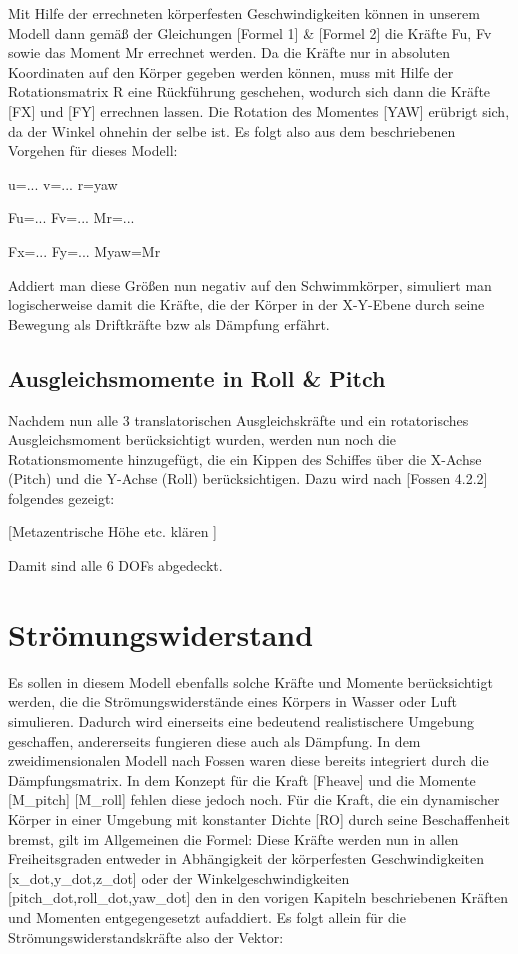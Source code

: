 Mit Hilfe der errechneten körperfesten Geschwindigkeiten können in unserem Modell dann gemäß der Gleichungen [Formel 1] & [Formel 2] die Kräfte Fu, Fv sowie das Moment Mr errechnet werden. 
Da die Kräfte nur in absoluten Koordinaten auf den Körper gegeben werden können, muss mit Hilfe der Rotationsmatrix R eine Rückführung geschehen, wodurch sich dann die Kräfte [FX] und [FY] errechnen lassen. Die Rotation des Momentes [YAW] erübrigt sich, da der Winkel ohnehin der selbe ist. 
Es folgt also aus dem beschriebenen Vorgehen für dieses Modell:

u=...
v=...
r=yaw

Fu=...
Fv=...
Mr=...

Fx=...
Fy=...
Myaw=Mr

Addiert man diese Größen nun negativ auf den Schwimmkörper, simuliert man logischerweise damit die Kräfte, die der Körper in der X-Y-Ebene durch seine Bewegung als Driftkräfte bzw als Dämpfung erfährt. 

%
\subsection{Ausgleichsmomente in Roll & Pitch}
%
Nachdem nun alle 3 translatorischen Ausgleichskräfte und ein rotatorisches Ausgleichsmoment berücksichtigt wurden, werden nun noch die Rotationsmomente hinzugefügt, die ein Kippen des Schiffes über die X-Achse (Pitch) und die Y-Achse (Roll) berücksichtigen. 
Dazu wird nach [Fossen 4.2.2] folgendes gezeigt:

[Metazentrische Höhe etc. klären ]


Damit sind alle 6 DOFs abgedeckt. 
%
\section{Strömungswiderstand}
%
Es sollen in diesem Modell ebenfalls solche Kräfte und Momente berücksichtigt werden, die die Strömungswiderstände eines Körpers in Wasser oder Luft simulieren. Dadurch wird einerseits eine bedeutend realistischere Umgebung geschaffen, andererseits fungieren diese auch als Dämpfung.
In dem zweidimensionalen Modell nach Fossen waren diese bereits integriert durch die Dämpfungsmatrix. In dem Konzept für die Kraft [Fheave] und die Momente [M_pitch] [M_roll] fehlen diese jedoch noch.
Für die Kraft, die ein dynamischer Körper in einer Umgebung mit konstanter Dichte [RO] durch seine Beschaffenheit bremst, gilt im Allgemeinen die Formel:
%
%
%
Diese Kräfte werden nun in allen Freiheitsgraden entweder in Abhängigkeit der körperfesten Geschwindigkeiten [x_dot,y_dot,z_dot] oder der Winkelgeschwindigkeiten [pitch_dot,roll_dot,yaw_dot] den in den vorigen Kapiteln beschriebenen Kräften und Momenten entgegengesetzt aufaddiert. 
Es folgt allein für die Strömungswiderstandskräfte also der Vektor:

